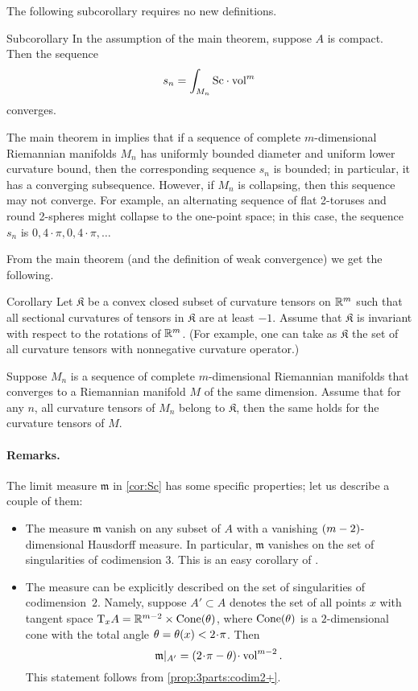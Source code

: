 The following subcorollary requires no new definitions.

\begin{thm}{Subcorollary}\label{cor:cor:Sc}
In the assumption of the main theorem, suppose $A$ is compact.
Then the sequence
\[s_n=\int_{M_n}\Sc \cdot\vol^m\]
converges.
\end{thm}

The main theorem in \cite{petrunin-SC} implies that if a sequence of complete $m$-dimensional Riemannian  manifolds $M_n$ has uniformly bounded diameter and uniform lower curvature bound, then 
the corresponding sequence $s_n$ is bounded;
in particular, it has a converging subsequence.
However, if $M_n$ is collapsing, then this sequence may not converge.
For example, an alternating sequence of flat 2-toruses and round 2-spheres might collapse to the one-point space; in this case, the sequence $s_n$ is $0,4\cdot\pi,0,4\cdot\pi,\dots$

From the main theorem (and the definition of weak convergence) we get the following.

\begin{thm}{Corollary}
Let $\mathfrak{K}$ be a convex closed subset of curvature tensors on $\mathbb{R}^m$ 
such that 
all sectional curvatures of tensors in $\mathfrak{K}$ are at least $-1$.
Assume that $\mathfrak{K}$ is invariant with respect to the rotations of $\mathbb{R}^m$.
(For example, one can take as $\mathfrak{K}$ the set of all curvature tensors with nonnegative curvature operator.)

Suppose $M_n$ is a sequence of complete $m$-dimensional Riemannian manifolds that converges to a Riemannian manifold $M$ of the same dimension.
Assume that for any $n$, all curvature tensors of $M_n$ belong to $\mathfrak{K}$, 
then the same holds for the curvature tensors of $M$.
\end{thm}



\paragraph{Remarks.}
The limit measure $\mathfrak m$ in \ref{cor:Sc} has some specific properties;
let us describe a couple of them:
\begin{itemize}
\item The measure $\mathfrak m$ vanish on any subset of $A$ with a vanishing $(m\zz-2)$-dimensional Hausdorff measure.
In particular, $\mathfrak m$ vanishes on the set of singularities of codimension 3.
This is an easy corollary of \cite{petrunin-SC}.

\item The measure can be explicitly described on the set of singularities
of codimension~$2$.
Namely, suppose $A'\subset A$
denotes the set of all points $x$ with tangent space
$\T_xA\zz=\R^{m-2}\zz\times \Cone(\theta)$,
where $\operatorname{Cone}(\theta)$ is a $2$-dimensional cone
with the total angle $\theta\zz=\theta(x)\zz<2\cdot\pi$.
Then 
$$\mathfrak m|_{A'}=(2\cdot \pi-\theta)\cdot \vol^{m-2}.$$
This statement follows from \ref{prop:3parts:codim2+}.
\end{itemize}

